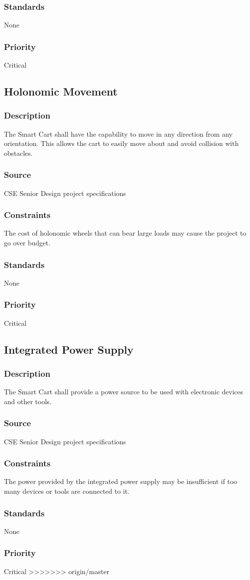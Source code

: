 \subsubsection{Standards}
None
\subsubsection{Priority}
Critical


\subsection{Holonomic Movement}
\subsubsection{Description}
The Smart Cart shall have the capability to move in any direction from any orientation. This allows the cart to easily move about and avoid collision with obstacles.
\subsubsection{Source}
CSE Senior Design project specifications
\subsubsection{Constraints}
The cost of holonomic wheels that can bear large loads may cause the project to go over budget.
\subsubsection{Standards}
None
\subsubsection{Priority}
Critical


\subsection{Integrated Power Supply}
\subsubsection{Description}
The Smart Cart shall provide a power source to be used with electronic devices and other tools. 
\subsubsection{Source}
CSE Senior Design project specifications
\subsubsection{Constraints}
The power provided by the integrated power supply may be insufficient if too many devices or tools are connected to it.
\subsubsection{Standards}
None
\subsubsection{Priority}
Critical
>>>>>>> origin/master
